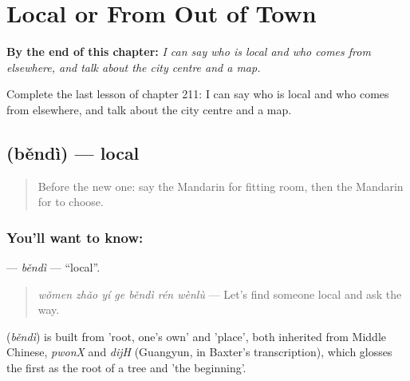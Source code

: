 
\chapter{Local or From Out of Town}
\label{ch:zh-local-or-from-out-of-town}

\begin{chapteropening}
\textbf{By the end of this chapter:} \emph{I can say who is local and who comes from elsewhere, and talk about the city centre and a map.}

Complete the last lesson of chapter 211: I can say who is local and who comes from elsewhere, and talk about the city centre and a map.
\end{chapteropening}

\section[\texorpdfstring{\zh{本地} (běndì)}{本地 (běndì)}]{ (běndì) — local}

\label{lesson:ZH-C211-bendi}



\begin{quote}
Before the new one: say the Mandarin for fitting room, then the Mandarin for to choose.
\end{quote}

\subsection*{You'll want to know: }
\textbf{} — \emph{běndì} — \textquotedblleft{}local\textquotedblright{}.

\begin{quote}
\textbf{} \emph{wǒmen zhǎo yí ge běndì rén wènlù} — Let's find someone local and ask the way.
\end{quote}

\begin{cousinweb}
\textbf{} (\emph{běndì}) is built from  'root, one's own' and  'place', both inherited from Middle Chinese, \emph{pwonX} and \emph{dijH} (Guangyun, in Baxter's transcription), which glosses the first as the root of a tree and 'the beginning'.
\end{cousinweb}

